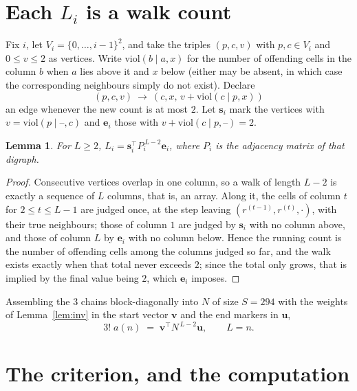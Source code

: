 \documentclass[11pt,a4paper]{article}
\theoremstyle{plain}
\newtheorem{lemma}[theorem]{Lemma}
\theoremstyle{definition}
\begin{document}
\section{Each $L_i$ is a walk count}

Fix $i$, let $V_i=\{0,\dots,i-1\}^{2}$, and take the triples $(p,c,v)$ with
$p,c\in V_i$ and $0\le v\le2$ as vertices. Write $\mathrm{viol}(b\mid a,x)$ for the number
of offending cells in the column $b$ when $a$ lies above it and $x$ below (either may be
absent, in which case the corresponding neighbours simply do not exist). Declare
\[
(p,c,v)\ \longrightarrow\ (c,x,\,v+\mathrm{viol}(c\mid p,x))
\]
an edge whenever the new count is at most $2$. Let $\mathbf{s}_i$ mark the vertices with
$v=\mathrm{viol}(p\mid\text{--},c)$ and $\mathbf{e}_i$ those with
$v+\mathrm{viol}(c\mid p,\text{--})=2$.

\begin{lemma}\label{lem:walk}
For $L\ge2$, $L_i=\mathbf{s}_i^{\!\top}P_i^{\,L-2}\mathbf{e}_i$, where $P_i$ is the
adjacency matrix of that digraph.
\end{lemma}

\begin{proof}
Consecutive vertices overlap in one column, so a walk of length $L-2$ is exactly a sequence
of $L$ columns, that is, an array. Along it, the cells of column $t$ for $2\le t\le L-1$ are
judged once, at the step leaving $(r^{(t-1)},r^{(t)},\cdot)$, with their true neighbours;
those of column $1$ are judged by $\mathbf{s}_i$ with no column above, and those of column
$L$ by $\mathbf{e}_i$ with no column below. Hence the running count is the number of
offending cells among the columns judged so far, and the walk exists exactly when that total
never exceeds $2$; since the total only grows, that is implied by the final value being
$2$, which $\mathbf{e}_i$ imposes.
\end{proof}

Assembling the $3$ chains block-diagonally into $N$ of size $S=294$ with the weights of
Lemma~\ref{lem:inv} in the start vector $\mathbf{v}$ and the end markers in
$\mathbf{u}$,
\begin{equation}\label{eq:walk2}
3!\;a(n)\;=\;\mathbf{v}^{\!\top}N^{\,L-2}\mathbf{u},\qquad L=n .
\end{equation}

\section{The criterion, and the computation}
\end{document}
